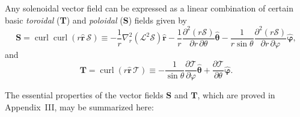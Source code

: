 Any solenoidal vector field can be expressed as a linear combination
of certain basic \emph{toroidal} (\textbf{T}) and \emph{poloidal} (\textbf{S}) fields given by
\begin{equation}\label{eq:6-49}
\mathbf{S} = \operatorname{curl}\operatorname{curl}(r\hat{\boldsymbol{r}}\,\mathscr{S}) \equiv -\frac{1}{r}\nabla^2_r(\mathscr{L}^2\mathscr{S})\hat{\boldsymbol{r}} - \frac{1}{r}\frac{\partial^2(r\mathscr{S})}{\partial r\,\partial\theta}\hat{\boldsymbol{\theta}} - \frac{1}{r\sin\theta}\frac{\partial^2(r\mathscr{S})}{\partial r\,\partial\varphi}\hat{\boldsymbol{\varphi}},
\end{equation}
and
\begin{equation}\label{eq:6-50}
\mathbf{T} = \operatorname{curl}(r\hat{\boldsymbol{r}}\,\mathscr{T}) \equiv -\frac{1}{\sin\theta}\frac{\partial \mathscr{T}}{\partial\varphi}\hat{\boldsymbol{\theta}} + \frac{\partial \mathscr{T}}{\partial\theta}\hat{\boldsymbol{\varphi}}.
\end{equation}

The essential properties of the vector fields $\mathbf{S}$ and $\mathbf{T}$, which are proved
in Appendix~III, may be summarized here:

